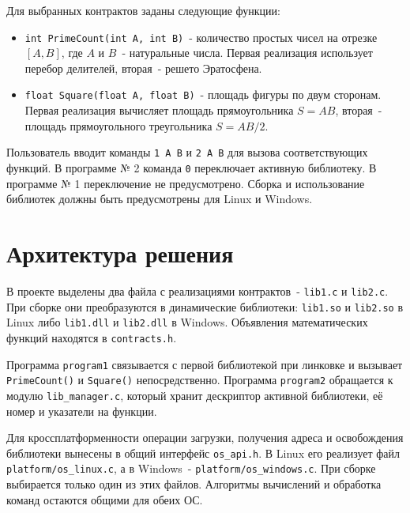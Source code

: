 \documentclass[12pt,a4paper]{article}
\begin{document}
Для выбранных контрактов заданы следующие функции:
\begin{itemize}
  \item \texttt{int PrimeCount(int A, int B)}~- количество простых чисел на отрезке $[A,B]$, где $A$ и $B$~- натуральные числа. Первая реализация использует перебор делителей, вторая~- решето Эратосфена.
  \item \texttt{float Square(float A, float B)}~- площадь фигуры по двум сторонам. Первая реализация вычисляет площадь прямоугольника $S=AB$, вторая~- площадь прямоугольного треугольника $S=AB/2$.
\end{itemize}

Пользователь вводит команды \texttt{1 A B} и \texttt{2 A B} для вызова соответствующих функций. В программе № 2 команда \texttt{0} переключает активную библиотеку. В программе № 1 переключение не предусмотрено. Сборка и использование библиотек должны быть предусмотрены для Linux и Windows.

\section{Архитектура решения}
В проекте выделены два файла с реализациями контрактов~- \texttt{lib1.c} и \texttt{lib2.c}. При сборке они преобразуются в динамические библиотеки: \texttt{lib1.so} и \texttt{lib2.so} в Linux либо \texttt{lib1.dll} и \texttt{lib2.dll} в Windows. Объявления математических функций находятся в \texttt{contracts.h}.

Программа \texttt{program1} связывается с первой библиотекой при линковке и вызывает \texttt{PrimeCount()} и \texttt{Square()} непосредственно. Программа \texttt{program2} обращается к модулю \texttt{lib\_manager.c}, который хранит дескриптор активной библиотеки, её номер и указатели на функции.

Для кроссплатформенности операции загрузки, получения адреса и освобождения библиотеки вынесены в общий интерфейс \texttt{os\_api.h}. В Linux его реализует файл \texttt{platform/os\_linux.c}, а в Windows~- \texttt{platform/os\_windows.c}. При сборке выбирается только один из этих файлов. Алгоритмы вычислений и обработка команд остаются общими для обеих ОС.
\end{document}
